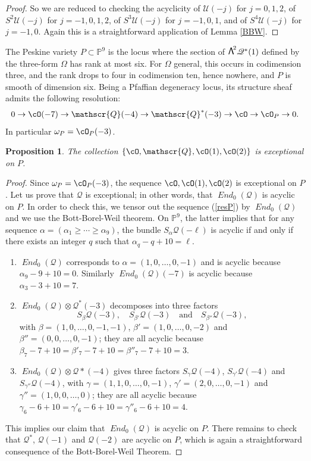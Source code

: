 \documentclass[JEP,XML,SOM,Unicode,NoEqCountersInSection]{cedram}
\newcommand\bw[1]{{\hbox{\large$\mathsf{\Lambda}$}^{\!#1}}}
\DeclareMathOperator{\iEnd}{\mathit{End}}
\let\mathcal\mathscr
\theoremstyle{plain}
\newtheorem{prop}[theorem]{Proposition}
\theoremstyle{definition}
\newcommand{\PP}{\mathbb{P}}
\newcommand{\sheaf}[1]{\mathcal{#1}}
\newcommand{\kq}{\sheaf{Q}}
\newcommand{\ku}{\sheaf{U}}
\begin{document}
\begin{proof}
So we are reduced to checking the acyclicity of $\ku(-j)$ for $j=0,1,2$, of $S^2\ku(-j)$
for $j=-1,0,1,2$, of $S^3\ku(-j)$ for $j=-1,0,1$, and of $S^4\ku(-j)$ for $j=-1,0$.
Again this is a straightforward application of Lemma \ref{BBW}.
\end{proof}

The Peskine variety $P\subset\PP^9$ is the locus where the section of $\bw2\kq^* (1)$
defined by the three-form $\Omega$ has rank at most six. For $\Omega$ general, this occurs
in codimension three, and the rank drops to four in codimension ten, hence nowhere, and
$P$ is smooth of dimension six. Being a Pfaffian degeneracy locus, its structure sheaf admits
the following resolution:\vspace*{-3pt}
\begin{equation*}\label{resP}
0\to \cO(-7)\to \kq(-4)\to \kq^* (-3)\to \cO\to\cO_P\to 0.
\end{equation*}
In particular $\omega_P=\cO_P(-3)$.

\begin{prop}\label{prop:exc-coll-on-P}
The collection $\{\cO, \kq, \cO(1), \cO(2)\}$ is exceptional on $P$.
\end{prop}

\begin{proof}
Since $\omega_P=\cO_P(-3)$, the sequence $\cO, \cO(1), \cO(2)$ is exceptional on $P$.
Let us prove that $\kq$ is exceptional; in other words, that $\iEnd_0(\kq)$ is acyclic on $P$.
In order to
check this, we tensor out the sequence (\ref{resP}) by $\iEnd_0(\kq)$ and we use
the Bott-Borel-Weil theorem. On $\PP^9$, the latter implies that for any sequence $\alpha
=(\alpha_1\ge\cdots\ge\alpha_9)$, the bundle $S_\alpha \kq (-\ell)$ is acyclic if and only if
there exists an integer $q$ such that $\alpha_{q}-q+10=\ell$.
\begin{enumerate}
\item $\iEnd_0(\kq)$ corresponds to $\alpha = (1,0,\dots,0,-1)$ and is acyclic because
$\alpha_{9}-9+10=0$. Similarly $\iEnd_0(\kq)(-7)$ is acyclic because $\alpha_3-3+10=7$.
\item $\iEnd_0(\kq)\otimes \kq^* (-3)$ decomposes into three factors\vspace*{-3pt}
\[
S_\beta \kq(-3),\quad S_{\beta'}\kq(-3)\quad\text{and}\quad S_{\beta''}\kq(-3),
\]
with $\beta = (1,0,\dots,0,-1,-1)$, $\beta' = (1,0,\dots,0,-2)$ and $\beta'' = (0,0,\dots,0,-1)$;
they are all acyclic because $\beta_7-7+10=\beta'_7-7+10=\beta''_7-7+10=3$.
\item $\iEnd_0(\kq)\otimes \kq* (-4)$ gives three factors $S_\gamma \kq(-4)$, $S_{\gamma'}\kq(-4)$
and $S_{\gamma''}\kq(-4)$,
with $\gamma = (1,1,0,\dots,0,-1)$, $\gamma' = (2,0,\dots,0,-1)$ and $\gamma'' = (1,0,0,\dots,0)$;
they are all acyclic because $\gamma_6-6+10=\gamma'_6-6+10=\gamma''_6-6+10=4$.
\end{enumerate}
This implies our claim that $\iEnd_0(\kq)$ is acyclic on $P$. There remains to check that
$\kq^*$, $\kq(-1)$ and $\kq(-2)$ are acyclic on $P$, which is again a straightforward
consequence of the Bott-Borel-Weil Theorem.
\end{proof}
\end{document}

